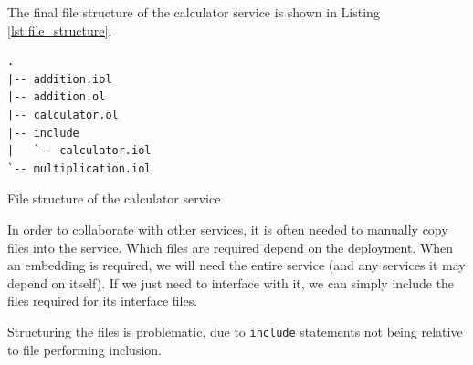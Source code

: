 The final file structure of the calculator service is shown in Listing
\ref{lst:file_structure}.

\begin{listing}[H]
\begin{verbatim}
.
|-- addition.iol
|-- addition.ol
|-- calculator.ol
|-- include
|   `-- calculator.iol
`-- multiplication.iol
\end{verbatim}
\caption{File structure of the calculator service}
\label{lst:file_structure}
\end{listing}

\begin{observation}

    In order to collaborate with other services, it is often needed to manually
    copy files into the service. Which files are required depend on the
    deployment. When an embedding is required, we will need the entire service
    (and any services it may depend on itself). If we just need to interface
    with it, we can simply include the files required for its interface files.

    Structuring the files is problematic, due to \verb!include! statements not
    being relative to file performing inclusion.

\end{observation}

